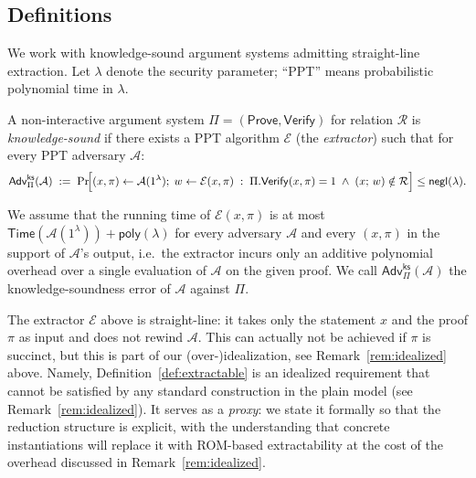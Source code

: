 \subsection{Definitions}\label{sec:security:defs}

We work with knowledge-sound argument systems admitting straight-line
extraction.  Let $\lambda$ denote the security parameter;
``PPT'' means probabilistic polynomial time in $\lambda$.

\begin{definition}\label{def:extractable}
A non-interactive argument system $\Pi=(\mathsf{Prove},\mathsf{Verify})$ for
relation $\mathcal{R}$ is \emph{knowledge-sound} if there exists a PPT
algorithm $\mathcal{E}$ (the \emph{extractor}) such that for every PPT
adversary $\mathcal{A}$:
\begin{equation}\label{eq:extractable}
  \mathsf{Adv}^{\mathsf{ks}}_{\Pi}(\mathcal{A}) \;:=\;
  \Pr\!\Bigl[
    (x,\pi)\leftarrow\mathcal{A}(1^\lambda);\; w\leftarrow\mathcal{E}(x,\pi)
    \;:\; \Pi.\mathsf{Verify}(x,\pi)=1 \;\wedge\; (x;\,w)\notin\mathcal{R}
  \Bigr] \leq \mathsf{negl}(\lambda).
\end{equation}

We assume that the running time of $\mathcal{E}(x,\pi)$ is at most
$\mathsf{Time}(\mathcal{A}(1^\lambda)) + \mathsf{poly}(\lambda)$ for every
adversary $\mathcal{A}$ and every $(x,\pi)$ in the support of $\mathcal{A}$'s
output, i.e.\ the
extractor incurs only an additive polynomial overhead over a single evaluation of
$\mathcal{A}$ on the given proof.
We call $\mathsf{Adv}^{\mathsf{ks}}_{\Pi}(\mathcal{A})$ the knowledge-soundness
error of $\mathcal{A}$ against $\Pi$.
\end{definition}

\begin{remark}
The extractor $\mathcal{E}$ above is straight-line: it takes only the
statement $x$ and the proof $\pi$ as input and does not rewind $\mathcal{A}$. This can actually not be achieved if $\pi$ is succinct, but this is part of our (over-)idealization, see Remark~\ref{rem:idealized} above. Namely, Definition~\ref{def:extractable} is
an idealized requirement that cannot be satisfied by any standard construction
in the plain model (see Remark~\ref{rem:idealized}).  It serves as a
\emph{proxy}: we state it formally so that the reduction structure is
explicit, with the understanding that concrete instantiations will replace it
with ROM-based extractability at the cost of the overhead
discussed in Remark~\ref{rem:idealized}.
\end{remark}

